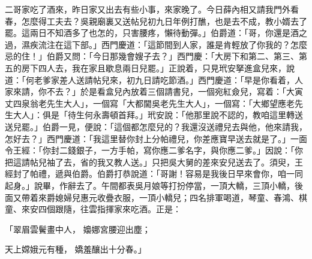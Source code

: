 \begin{showcontents}{}
二哥家吃了酒來，昨日家又出去有些小事，來家晚了。今日薛內相又請我門外看春，怎麼得工夫去？吳親廟裏又送帖兒初九日年例打醮，也是去不成，教小婿去了罷。這兩日不知酒多了也怎的，只害腰疼，懶待動彈。」伯爵道：「哥，你還是酒之過，濕疾流注在這下部。」西門慶道：「這節間到人家，誰是肯輕放了你我的？怎麼忌的住！」伯爵又問：「今日那幾會嫂子去？」西門慶：「大房下和第二、第三、第五的房下四人去，我在家且歇息兩日兒罷。」正說着，只見玳安拏進盒兒來，說道：「何老爹家差人送請帖兒來，初九日請吃節酒。」西門慶道：「早是你看着，人家來請，你不去？」於是看盒兒內放着三個請書兒，一個宛紅僉兒，寫着：「大寅丈四泉翁老先生大人」，一個寫「大都閫吳老先生大人」，一個寫：「大鄉望應老先生大人」：俱是「待生何永壽頓首拜。」玳安說：「他那里說不認的，教咱這里轉送送兒罷。」伯爵一見，便說：「這個都怎麼兒的？我還沒送禮兒去與他，他來請我，怎好去？」西門慶道：「我這里替你封上分帕禮兒，你差應寶早送去就是了。」一面令王經：「你封二錢銀子，一方手帕，寫你應二爹名字，與你應二爹。」因說：「你把這請帖兒袖了去，省的我又教人送。」只把吳大舅的差來安兒送去了。須臾，王經封了帕禮，遞與伯爵。伯爵打恭說道：「哥謝！容易是我後日早來會你，咱一同起身。」說畢，作辭去了。午間都表吳月娘等打扮停當，一頂大轎，三頂小轎，後面又帶着來爵媳婦兒惠元收疊衣服，一頂小轎兒；四名排軍喝道，琴童、春鴻、棋童、來安四個跟隨，往雲指揮家來吃酒。正是：

「翠眉雲鬢畫中人，  嬝娜宮腰迎出塵；

天上嫦娥元有種，  嬌羞釀出十分春。」


\end{showcontents}
